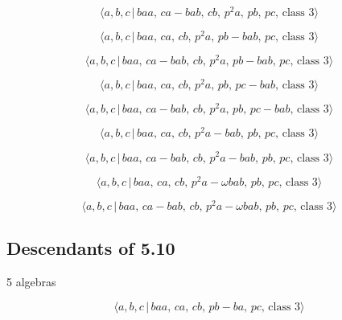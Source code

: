 \documentclass[10pt]{article}
\begin{document}
\begin{equation}
\langle a,b,c\,|\,baa,\,ca-bab,\,cb,\,p^2a,\,pb,\,pc,\,\text{class }3\rangle
\tag{6.198}
\end{equation}

\begin{equation}
\langle a,b,c\,|\,baa,\,ca,\,cb,\,p^2a,\,pb-bab,\,pc,\,\text{class }3\rangle
\tag{6.199}
\end{equation}

\begin{equation}
\langle a,b,c\,|\,baa,\,ca-bab,\,cb,\,p^2a,\,pb-bab,\,pc,\,\text{class }%
3\rangle  \tag{6.200}
\end{equation}

\begin{equation}
\langle a,b,c\,|\,baa,\,ca,\,cb,\,p^2a,\,pb,\,pc-bab,\,\text{class }3\rangle
\tag{6.201}
\end{equation}

\begin{equation}
\langle a,b,c\,|\,baa,\,ca-bab,\,cb,\,p^2a,\,pb,\,pc-bab,\,\text{class }%
3\rangle  \tag{6.202}
\end{equation}

\begin{equation}
\langle a,b,c\,|\,baa,\,ca,\,cb,\,p^2a-bab,\,pb,\,pc,\,\text{class }3\rangle
\tag{6.203}
\end{equation}

\begin{equation}
\langle a,b,c\,|\,baa,\,ca-bab,\,cb,\,p^2a-bab,\,pb,\,pc,\,\text{class }%
3\rangle  \tag{6.204}
\end{equation}

\begin{equation}
\langle a,b,c\,|\,baa,\,ca,\,cb,\,p^2a-\omega bab,\,pb,\,pc,\,\text{class }%
3\rangle  \tag{6.205}
\end{equation}

\begin{equation}
\langle a,b,c\,|\,baa,\,ca-bab,\,cb,\,p^2a-\omega bab,\,pb,\,pc,\,\text{
class }3\rangle  \tag{6.206}
\end{equation}

\subsection{Descendants of 5.10}

5 algebras

\begin{equation}
\langle a,b,c\,|\,baa,\,ca,\,cb,\,pb-ba,\,pc,\,\text{class }3\rangle 
\tag{6.207}
\end{equation}
\end{document}
